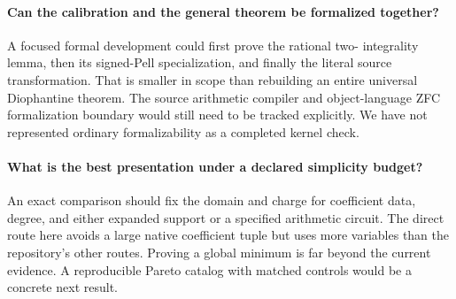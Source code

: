 \documentclass[10pt,letterpaper]{article}
\theoremstyle{remark}\newtheorem{remark}[theorem]{Remark}
\begin{document}
\paragraph{Can the calibration and the general theorem be formalized together?}
A focused formal development could first prove the rational two-
integrality lemma, then its signed-Pell specialization, and finally the
literal source transformation. That is smaller in scope than rebuilding
an entire universal Diophantine theorem. The source arithmetic compiler
and object-language ZFC formalization boundary would still need to be
tracked explicitly. We have not represented ordinary formalizability
as a completed kernel check.

\paragraph{What is the best presentation under a declared simplicity budget?}
An exact comparison should fix the domain and charge for coefficient
data, degree, and either expanded support or a specified arithmetic
circuit. The direct route here avoids a large native coefficient tuple
but uses more variables than the repository's other routes. Proving a
global minimum is far beyond the current evidence. A reproducible
Pareto catalog with matched controls would be a concrete next result.

\appendix
\end{document}
